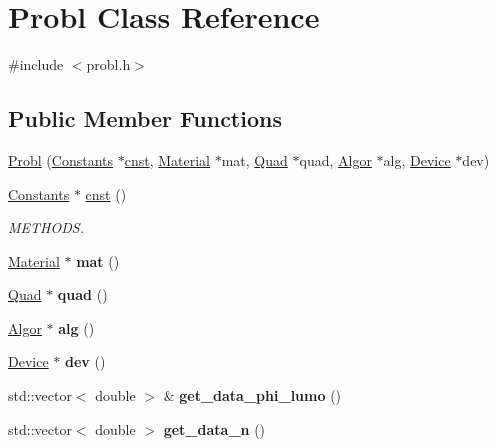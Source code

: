 \hypertarget{classProbl}{\section{Probl Class Reference}
\label{classProbl}
}


{\ttfamily \#include $<$probl.\-h$>$}

\subsection*{Public Member Functions}
\begin{DoxyCompactItemize}
\item 
\hyperlink{classProbl_a9e629aaad55cdcaeb82389d3a1364720}{Probl} (\hyperlink{classConstants}{Constants} $\ast$\hyperlink{classProbl_a36ecf30ecc45e022eba9e4cb031454de}{cnst}, \hyperlink{classMaterial}{Material} $\ast$mat, \hyperlink{classQuad}{Quad} $\ast$quad, \hyperlink{classAlgor}{Algor} $\ast$alg, \hyperlink{classDevice}{Device} $\ast$dev)
\item 
\hypertarget{classProbl_a36ecf30ecc45e022eba9e4cb031454de}{\hyperlink{classConstants}{Constants} $\ast$ \hyperlink{classProbl_a36ecf30ecc45e022eba9e4cb031454de}{cnst} ()}\label{classProbl_a36ecf30ecc45e022eba9e4cb031454de}

\begin{DoxyCompactList}\small\item\em M\-E\-T\-H\-O\-D\-S. \end{DoxyCompactList}\item 
\hypertarget{classProbl_a6294806d612a332c0bf9d64902a72c0b}{\hyperlink{classMaterial}{Material} $\ast$ {\bfseries mat} ()}\label{classProbl_a6294806d612a332c0bf9d64902a72c0b}

\item 
\hypertarget{classProbl_a98e95e97522d32e5a6c8d07200b1514f}{\hyperlink{classQuad}{Quad} $\ast$ {\bfseries quad} ()}\label{classProbl_a98e95e97522d32e5a6c8d07200b1514f}

\item 
\hypertarget{classProbl_a21683aca0962db3ef7e2a310787a7ea8}{\hyperlink{classAlgor}{Algor} $\ast$ {\bfseries alg} ()}\label{classProbl_a21683aca0962db3ef7e2a310787a7ea8}

\item 
\hypertarget{classProbl_af684e3cdb7f366673d5bd15ae3df4c13}{\hyperlink{classDevice}{Device} $\ast$ {\bfseries dev} ()}\label{classProbl_af684e3cdb7f366673d5bd15ae3df4c13}

\item 
\hypertarget{classProbl_afce400c938e50dd0ac84d5429c4879fe}{std\-::vector$<$ double $>$ \& {\bfseries get\-\_\-data\-\_\-phi\-\_\-lumo} ()}\label{classProbl_afce400c938e50dd0ac84d5429c4879fe}

\item 
\hypertarget{classProbl_a0667fe20406ae8d12b60e9bf8bd89a97}{std\-::vector$<$ double $>$ {\bfseries get\-\_\-data\-\_\-n} ()}\label{classProbl_a0667fe20406ae8d12b60e9bf8bd89a97}

\end{DoxyCompactItemize}


